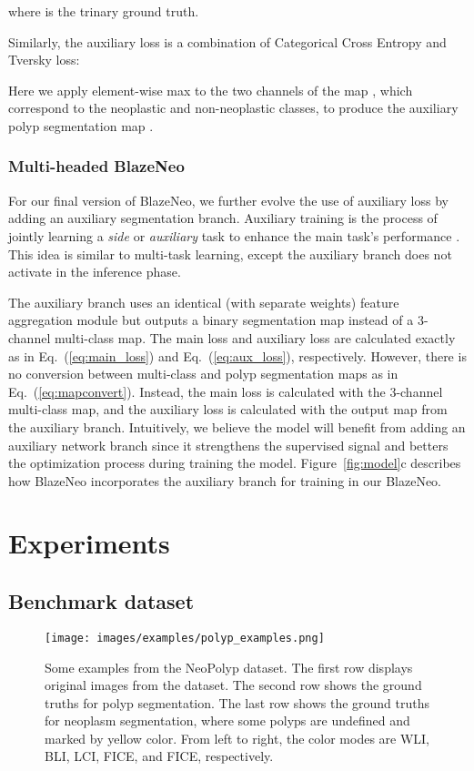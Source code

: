 \documentclass{ieeeaccess}
\newcommand{\ModelName}{BlazeNeo\xspace}
\begin{document}
where  is the trinary ground truth.

Similarly, the auxiliary loss is a combination of Categorical Cross Entropy and Tversky loss:


Here we apply element-wise max to the two channels of the map , which correspond to the neoplastic and non-neoplastic classes, to produce the auxiliary polyp segmentation map .



\subsubsection{Multi-headed \ModelName}
For our final version of \ModelName, we further evolve the use of auxiliary loss by adding an auxiliary segmentation branch.
Auxiliary training is the process of jointly learning a \textit{side} or \textit{auxiliary} task to enhance the main task's performance \cite{chennupati2019auxnet,zhang2020auxiliary}. This idea is similar to multi-task learning, except the auxiliary branch does not activate in the inference phase.


The auxiliary branch uses an identical (with separate weights) feature aggregation module but outputs a binary segmentation map instead of a 3-channel multi-class map. The main loss and auxiliary loss are calculated exactly as in Eq.~(\ref{eq:main_loss}) and Eq.~(\ref{eq:aux_loss}), respectively. However, there is no conversion between multi-class and polyp segmentation maps as in Eq.~(\ref{eq:mapconvert}). Instead, the main loss is calculated with the 3-channel multi-class map, and the auxiliary loss is calculated with the output map from the auxiliary branch. Intuitively, we believe the model will benefit from adding an auxiliary network branch since it strengthens the supervised signal and betters the optimization process during training the model. Figure~\ref{fig:model}c describes how \ModelName incorporates the auxiliary branch for training in our BlazeNeo.




\section{Experiments}
\label{sec:experiment}

\subsection{Benchmark dataset}

\begin{figure*}[ht!]
    \begin{center}
        \texttt{[image: images/examples/polyp\_examples.png]}
    \end{center}
    \caption{Some examples from the NeoPolyp dataset. The first row displays original images from the dataset. The second row shows the ground truths for polyp segmentation. The last row shows the ground truths for neoplasm segmentation, where some polyps are undefined and marked by yellow color. From left to right, the color modes are WLI, BLI, LCI, FICE, and FICE, respectively.}
    \label{fig:polyp:examples}
\end{figure*}
\end{document}
